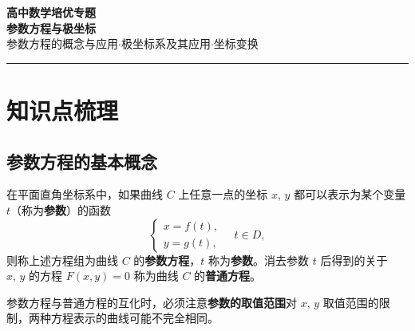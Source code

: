 \documentclass[12pt,a4paper]{ctexart}
\theoremstyle{definition}
\begin{document}
\begin{center}
  {\LARGE\bfseries\color{darkblue} 高中数学培优专题}\\[6pt]
  {\Huge\bfseries\color{mainblue} 参数方程与极坐标}\\[10pt]
  {\large\color{gray} 参数方程的概念与应用\quad$\cdot$\quad 极坐标系及其应用\quad$\cdot$\quad 坐标变换}
\end{center}

\vspace{4pt}\hrule\vspace{12pt}

\tableofcontents
\newpage

\section{知识点梳理}

\subsection{参数方程的基本概念}

\begin{definition}
  在平面直角坐标系中，如果曲线 $C$ 上任意一点的坐标 $x,\,y$ 都可以表示为某个变量 $t$（称为\textbf{参数}）的函数
  \[
    \begin{cases}
      x = f(t), \\[4pt]
      y = g(t),
    \end{cases}
    \quad t \in D,
  \]
  则称上述方程组为曲线 $C$ 的\textbf{参数方程}，$t$ 称为\textbf{参数}。消去参数 $t$ 后得到的关于 $x,\,y$ 的方程 $F(x,y)=0$ 称为曲线 $C$ 的\textbf{普通方程}。
\end{definition}

\begin{note}
  参数方程与普通方程的互化时，必须注意\textbf{参数的取值范围}对 $x,\,y$ 取值范围的限制，两种方程表示的曲线可能不完全相同。
\end{note}
\end{document}
